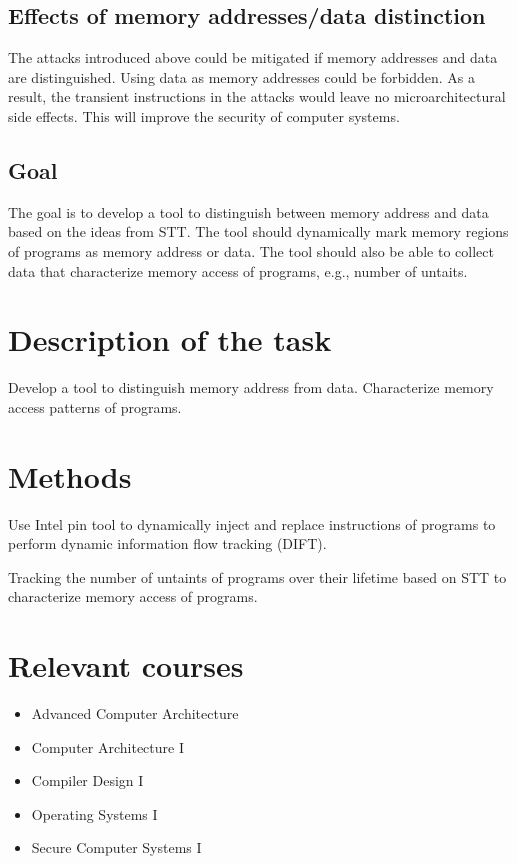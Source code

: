\documentclass[a4paper]{article}
\begin{document}
\subsection{Effects of memory addresses/data distinction}
The attacks introduced above could be mitigated if memory addresses
and data are distinguished. Using data as memory addresses could be
forbidden. As a result, the transient instructions in the attacks
would leave no microarchitectural side effects. This will improve the
security of computer systems.

\subsection{Goal}
The goal is to develop a tool to distinguish between memory address
and data based on the ideas from STT. The tool should dynamically mark
memory regions of programs as memory address or data. The tool should
also be able to collect data that characterize memory access of
programs, e.g., number of untaits.

\section{Description of the task}
Develop a tool to distinguish memory address from data. Characterize
memory access patterns of programs.

\section{Methods}
Use Intel pin tool to dynamically inject and replace instructions of
programs to perform dynamic information flow tracking (DIFT).

Tracking the number of untaints of programs over their lifetime based
on STT to characterize memory access of programs.

\section{Relevant courses}
\begin{itemize}
\item Advanced Computer Architecture
\item Computer Architecture I
\item Compiler Design I
\item Operating Systems I
\item Secure Computer Systems I
\end{itemize}
\end{document}
